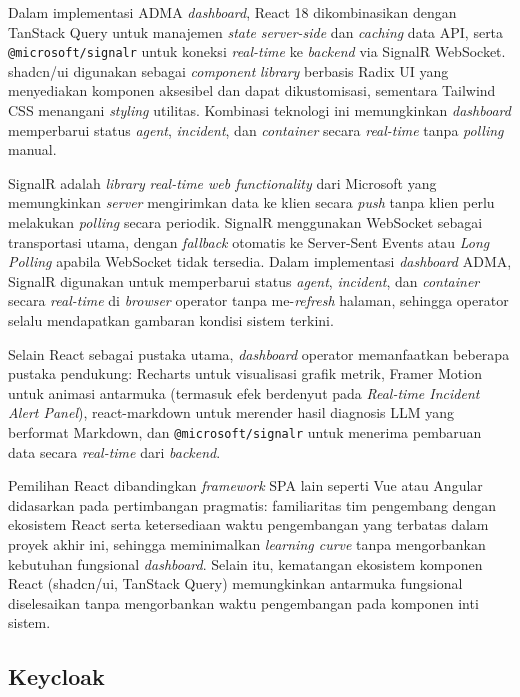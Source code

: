 Dalam implementasi ADMA \textit{dashboard}, React 18 dikombinasikan dengan TanStack Query untuk manajemen \textit{state} \textit{server-side} dan \textit{caching} data API, serta \texttt{@microsoft/signalr} untuk koneksi \textit{real-time} ke \textit{backend} via SignalR WebSocket. shadcn/ui digunakan sebagai \textit{component} \textit{library} berbasis Radix UI yang menyediakan komponen aksesibel dan dapat dikustomisasi, sementara Tailwind CSS menangani \textit{styling} utilitas. Kombinasi teknologi ini memungkinkan \textit{dashboard} memperbarui status \textit{agent}, \textit{incident}, dan \textit{container} secara \textit{real-time} tanpa \textit{polling} manual.

SignalR adalah \textit{library} \textit{real-time web functionality} dari Microsoft yang memungkinkan \textit{server} mengirimkan data ke klien secara \textit{push} tanpa klien perlu melakukan \textit{polling} secara periodik. SignalR menggunakan WebSocket sebagai transportasi utama, dengan \textit{fallback} otomatis ke Server-Sent Events atau \textit{Long Polling} apabila WebSocket tidak tersedia. Dalam implementasi \textit{dashboard} ADMA, SignalR digunakan untuk memperbarui status \textit{agent}, \textit{incident}, dan \textit{container} secara \textit{real-time} di \textit{browser} operator tanpa me-\textit{refresh} halaman, sehingga operator selalu mendapatkan gambaran kondisi sistem terkini.

Selain React sebagai pustaka utama, \textit{dashboard} operator memanfaatkan beberapa pustaka pendukung: Recharts untuk visualisasi grafik metrik, Framer Motion untuk animasi antarmuka (termasuk efek berdenyut pada \textit{Real-time Incident Alert Panel}), react-markdown untuk merender hasil diagnosis LLM yang berformat Markdown, dan \texttt{@microsoft/signalr} untuk menerima pembaruan data secara \textit{real-time} dari \textit{backend}.

Pemilihan React dibandingkan \textit{framework} SPA lain seperti Vue atau Angular didasarkan pada pertimbangan pragmatis: familiaritas tim pengembang dengan ekosistem React serta ketersediaan waktu pengembangan yang terbatas dalam proyek akhir ini, sehingga meminimalkan \textit{learning curve} tanpa mengorbankan kebutuhan fungsional \textit{dashboard}. Selain itu, kematangan ekosistem komponen React (shadcn/ui, TanStack Query) memungkinkan antarmuka fungsional diselesaikan tanpa mengorbankan waktu pengembangan pada komponen inti sistem.

\subsection{Keycloak}

